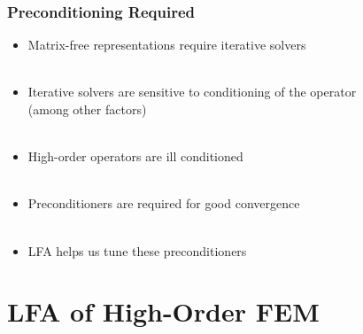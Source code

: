 \documentclass{beamer}
\begin{document}
\begin{frame}
\begin{center}
\frametitle{Preconditioning Required}

\begin{itemize}

\item Matrix-free representations require iterative solvers\\

~\\

\item Iterative solvers are sensitive to conditioning of the operator\\(among other factors)\\

~\\

\item High-order operators are ill conditioned\\

~\\

\item Preconditioners are required for good convergence\\

~\\

\item LFA helps us tune these preconditioners\\

\end{itemize}

\end{center}
\end{frame}

\section{LFA of High-Order FEM}
\end{document}
